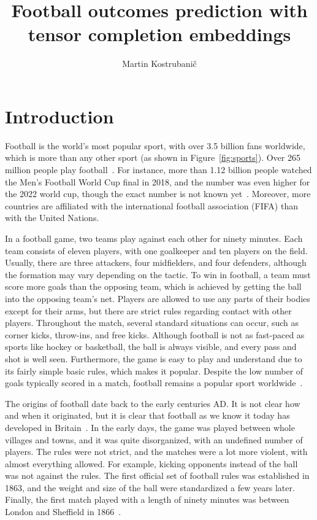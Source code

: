 \documentclass[thesis=M,english]{FITthesis}[2019/12/23]
\title{Football outcomes prediction with tensor completion
embeddings}
\author{Martin Kostrubanič} %
\begin{document}

\chapter{Introduction}

Football is the world's most popular sport, with over 3.5 billion fans worldwide, which is more than any other sport (as shown in Figure~\ref{fig:sports}). Over 265 million people play football~\cite{people_watching}. For instance, more than 1.12 billion people watched the Men's Football World Cup final in 2018, and the number was even higher for the 2022 world cup, though the exact number is not known yet~\cite{worldcup}. Moreover, more countries are affiliated with the international football association (FIFA) than with the United Nations.

In a football game, two teams play against each other for ninety minutes. Each team consists of eleven players, with one goalkeeper and ten players on the field. Usually, there are three attackers, four midfielders, and four defenders, although the formation may vary depending on the tactic. To win in football, a team must score more goals than the opposing team, which is achieved by getting the ball into the opposing team's net. Players are allowed to use any parts of their bodies except for their arms, but there are strict rules regarding contact with other players. Throughout the match, several standard situations can occur, such as corner kicks, throw-ins, and free kicks. Although football is not as fast-paced as sports like hockey or basketball, the ball is always visible, and every pass and shot is well seen. Furthermore, the game is easy to play and understand due to its fairly simple basic rules, which makes it popular. Despite the low number of goals typically scored in a match, football remains a popular sport worldwide~\cite{rules}.

The origins of football date back to the early centuries AD. It is not clear how and when it originated, but it is clear that football as we know it today has developed in Britain~\cite{football_roots}. In the early days, the game was played between whole villages and towns, and it was quite disorganized, with an undefined number of players. The rules were not strict, and the matches were a lot more violent, with almost everything allowed. For example, kicking opponents instead of the ball was not against the rules. The first official set of football rules was established in 1863, and the weight and size of the ball were standardized a few years later. Finally, the first match played with a length of ninety minutes was between London and Sheffield in 1866~\cite{history}.
\end{document}
